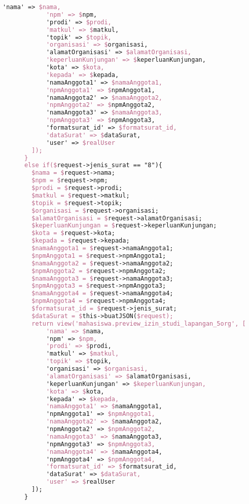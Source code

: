 \begin{lstlisting}[language=tex,basicstyle=\tiny,caption=PesanansuratController.php]
            'nama' => $nama,
            'npm' => $npm,
            'prodi' => $prodi,
            'matkul' => $matkul,
            'topik' => $topik,
            'organisasi' => $organisasi,
            'alamatOrganisasi' => $alamatOrganisasi,
            'keperluanKunjungan' => $keperluanKunjungan,
            'kota' => $kota,
            'kepada' => $kepada,
            'namaAnggota1' => $namaAnggota1,
            'npmAnggota1' => $npmAnggota1,
            'namaAnggota2' => $namaAnggota2,
            'npmAnggota2' => $npmAnggota2,
            'namaAnggota3' => $namaAnggota3,
            'npmAnggota3' => $npmAnggota3,
            'formatsurat_id' => $formatsurat_id,
            'dataSurat' => $dataSurat,
            'user' => $realUser
        ]);
      }
      else if($request->jenis_surat == "8"){
        $nama = $request->nama;
        $npm = $request->npm;
        $prodi = $request->prodi;
        $matkul = $request->matkul;
        $topik = $request->topik;
        $organisasi = $request->organisasi;
        $alamatOrganisasi = $request->alamatOrganisasi;
        $keperluanKunjungan = $request->keperluanKunjungan;
        $kota = $request->kota;
        $kepada = $request->kepada;
        $namaAnggota1 = $request->namaAnggota1;
        $npmAnggota1 = $request->npmAnggota1;
        $namaAnggota2 = $request->namaAnggota2;
        $npmAnggota2 = $request->npmAnggota2;
        $namaAnggota3 = $request->namaAnggota3;
        $npmAnggota3 = $request->npmAnggota3;
        $namaAnggota4 = $request->namaAnggota4;
        $npmAnggota4 = $request->npmAnggota4;
        $formatsurat_id = $request->jenis_surat;
        $dataSurat = $this->buatJSON($request);
        return view('mahasiswa.preview_izin_studi_lapangan_5org', [
            'nama' => $nama,
            'npm' => $npm,
            'prodi' => $prodi,
            'matkul' => $matkul,
            'topik' => $topik,
            'organisasi' => $organisasi,
            'alamatOrganisasi' => $alamatOrganisasi,
            'keperluanKunjungan' => $keperluanKunjungan,
            'kota' => $kota,
            'kepada' => $kepada,
            'namaAnggota1' => $namaAnggota1,
            'npmAnggota1' => $npmAnggota1,
            'namaAnggota2' => $namaAnggota2,
            'npmAnggota2' => $npmAnggota2,
            'namaAnggota3' => $namaAnggota3,
            'npmAnggota3' => $npmAnggota3,
            'namaAnggota4' => $namaAnggota4,
            'npmAnggota4' => $npmAnggota4,
            'formatsurat_id' => $formatsurat_id,
            'dataSurat' => $dataSurat,
            'user' => $realUser
        ]);
      }

\end{lstlisting}

